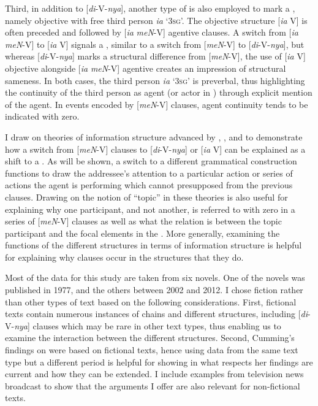 \documentclass[output=paper
,modfonts
,nonflat]{langsci/langscibook}
\begin{document}
Third, in addition to [\textit{di}-V-\textit{nya}], another type of  is also employed to mark a , namely objective  with free third person  \textit{ia} ‘3\textsc{sg}’. The objective  structure [\textit{ia} V] is often preceded and followed by [\textit{ia} \textit{meN}-V] agentive clauses. A switch from [\textit{ia} \textit{meN}-V] to [\textit{ia} V] signals a , similar to a switch from [\textit{meN}-V] to [\textit{di}-V-\textit{nya}], but whereas [\textit{di}-V-\textit{nya}] marks a structural difference from [\textit{meN}-V], the use of [\textit{ia} V] objective  alongside [\textit{ia} \textit{meN}-V] agentive  creates an impression of structural sameness. In both cases, the third person  \textit{ia} ‘3\textsc{sg}’ is preverbal, thus highlighting the continuity of the third person as agent (or actor in ) through explicit mention of the agent. In events encoded by [\textit{meN}-V] clauses, agent continuity tends to be indicated with zero.  

I draw on theories of information structure advanced by \citet{Lambrecht1994}, \citet{Gundel1999}, \citet{Gundel1993} and \citet{Gundel2004} to demonstrate how a switch from [\textit{meN}-V] clauses to [\textit{di}-V-\textit{nya}] or [\textit{ia} V] can be explained as a shift to a . As will be shown, a switch to a different grammatical construction functions to draw the addressee’s attention to a particular action or series of actions the agent is performing which cannot presupposed from the previous clauses. Drawing on the notion of “topic” in these theories is also useful for explaining why one participant, and not another, is referred to with zero in a series of [\textit{meN}-V] clauses as well as what the relation is between the topic participant and the focal elements in the . More generally, examining the functions of the different  structures in terms of information structure is helpful for explaining why clauses occur in the structures that they do. 

Most of the data for this study are taken from six  novels. One of the novels was published in 1977, and the others between 2002 and 2012. I chose fiction rather than other types of text based on the following considerations. First, fictional texts contain numerous instances of  chains and different  structures, including [\textit{di}-V-\textit{nya}] clauses which may be rare in other text types, thus enabling us to examine the interaction between the different  structures. Second, Cumming’s findings on  were based on fictional texts, hence using data from the same text type but a different period is helpful for showing in what respects her findings are current and how they can be extended. I include examples from television news broadcast to show that the arguments I offer are also relevant for non-fictional texts. 
\end{document}
